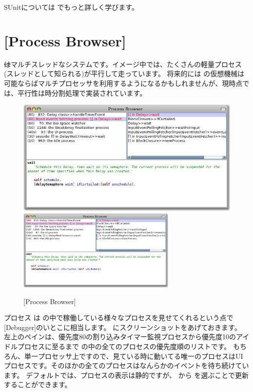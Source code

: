 \documentclass[a4paper,10pt,twoside]{book}
\begin{document}
SUnitについては  でもっと詳しく学びます。


\section{[Process Browser]}

\st はマルチスレッドなシステムです。イメージ中では、たくさんの軽量プロセス(スレッドとして知られる)が平行して走っています。
将来的には \pharo の仮想機械は可能ならばマルチプロセッサを利用するようになるかもしれませんが、現時点では、平行性は時分割処理で実装されています。

\begin{figure}[btp]
	\begin{center}
	\ifluluelse
		{\includegraphics[width=\textwidth]{processBrowser}}
		{\includegraphics[width=0.7\textwidth]{processBrowser}}
	\end{center}
	\caption{[Process Browser]}
\end{figure}

プロセス  は \pharo の中で稼働している様々なプロセスを見せてくれるという点で[Debugger]のいとこに相当します。
 にスクリーンショットをあげておきます。
左上のペインは、優先度80の割り込みタイマー監視プロセスから優先度10のアイドルプロセスに至るまで \pharo の中の全てのプロセスの優先度順のリストです。
もちろん、単一プロセッサ上ですので、見ている時に動いてる唯一のプロセスはUIプロセスです。そのほかの全てのプロセスはなんらかのイベントを待ち続けています。
デフォルトでは、プロセスの表示は静的ですが、 から  を選ぶことで更新することができます。
\end{document}
